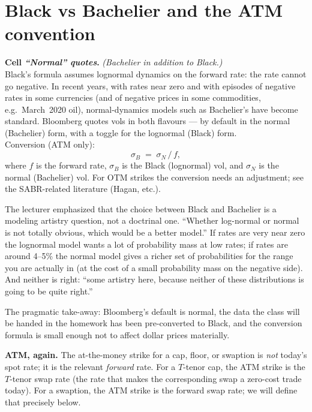 \section{Black vs Bachelier and the ATM convention}\label{L6-sec:blackbachelier}

\begin{keyblock}
\textbf{Cell \emph{``Normal'' quotes}.}
\emph{(Bachelier in addition to Black.)}\\
Black's formula assumes lognormal dynamics on the forward rate: the
rate cannot go negative. In recent years, with rates near zero and
with episodes of negative rates in some currencies (and of negative
prices in some commodities, e.g.\ March~2020 oil), normal-dynamics
models such as Bachelier's have become standard. Bloomberg quotes vols
in both flavours --- by default in the normal (Bachelier) form, with
a toggle for the lognormal (Black) form.\\
Conversion (ATM only):
\[
  \sigma_B \;=\; \sigma_N \,/\, f,
\]
where $f$ is the forward rate, $\sigma_B$ is the Black (lognormal)
vol, and $\sigma_N$ is the normal (Bachelier) vol. For OTM strikes
the conversion needs an adjustment; see the SABR-related literature
(Hagan, etc.).
\end{keyblock}

The lecturer emphasized that the choice between Black and Bachelier
is a modeling artistry question, not a doctrinal one. ``Whether
log-normal or normal is not totally obvious, which would be a better
model.'' If rates are very near zero the lognormal model wants a lot
of probability mass at low rates; if rates are around 4--5\% the
normal model gives a richer set of probabilities for the range you
are actually in (at the cost of a small probability mass on the
negative side). And neither is right: ``some artistry here, because
neither of these distributions is going to be quite right.''

The pragmatic take-away: Bloomberg's default is normal, the data the
class will be handed in the homework has been pre-converted to Black,
and the conversion formula is small enough not to affect dollar
prices materially.

\begin{keyblock}
\textbf{ATM, again.}
The at-the-money strike for a cap, floor, or swaption is \emph{not}
today's spot rate; it is the relevant \emph{forward} rate. For a
$T$-tenor cap, the ATM strike is the $T$-tenor swap rate (the rate
that makes the corresponding swap a zero-cost trade today). For a
swaption, the ATM strike is the forward swap rate; we will define
that precisely below.
\end{keyblock}

